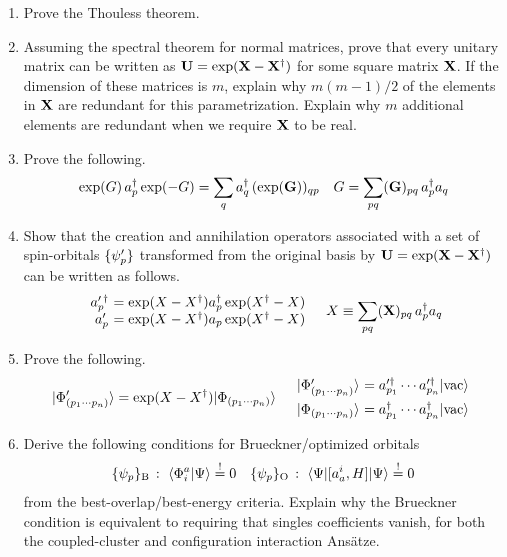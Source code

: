 \documentclass[11pt]{article}
\begin{document}
\begin{enumerate}
\item
Prove the Thouless theorem.

\item
Assuming the spectral theorem for normal matrices, prove that every unitary matrix can be written as
$
  \mathbf{U}
=
  \mathrm{exp}(\mathbf{X} - \mathbf{X}^\dagger)
$
for some square matrix $\mathbf{X}$.
If the dimension of these matrices is $m$, explain why $m(m-1)/2$ of the elements in $\mathbf{X}$ are redundant for this parametrization.
Explain why $m$ additional elements are redundant when we require $\mathbf{X}$ to be real.


\item
Prove the following.
\begin{align}
  \mathrm{exp}(G)\,a_p^\dagger\,\mathrm{exp}(-G)
=
  \sum_q
  a_q^\dagger\,
  (\mathrm{exp}(\mathbf{G}))_{qp}
&&
  G
=
  \sum_{pq}
  (\mathbf{G})_{pq}\,
  a_p^\dagger a_q
\end{align}



\item
Show that the creation and annihilation operators associated with a set of spin-orbitals $\{\psi _p'\}$ transformed from the original basis by $\mathbf{U}=\mathrm{exp}(\mathbf{X} - \mathbf{X}^\dagger)$ can be written as follows.
\begin{align}
\begin{array}{r@{\ }l}
  a_p^{\prime\,\dagger}
&=
  \mr{exp}(X - X\dg)
  a_p\dg\,
  \mr{exp}(X\dg - X)
\\
  a_p^{\prime}
&=
  \mr{exp}(X - X\dg)
  a_p\,
  \mr{exp}(X\dg - X)
\end{array}
&&
  X
\equiv
  \sum_{pq}
  (\bo{X})_{pq}\,
  a_p\dg a_q
\end{align}


\item
Prove the following.
\begin{align}
  \kt{\F'_{(p_1\cd p_n)}}
=
  \mr{exp}(X - X\dg)
  \kt{\F_{(p_1\cd p_n)}}
&&
\begin{array}{r@{\ }l}
  \kt{\F'_{(p_1\cd p_n)}}
&=
  a_{p_1}^{\prime \dagger}
\cd
  a_{p_n}^{\prime \dagger}
  \kt{\vac}
\\[5pt]
  \kt{\F_{(p_1\cd p_n)}}
&=
  a_{p_1}^{ \dagger}
\cd
  a_{p_n}^{ \dagger}
  \kt{\vac}
\end{array}
\end{align}

\item
Derive the following conditions for Brueckner/optimized orbitals
\begin{align}
\label{eq:brueckner-and-oo-explicit-condition}
  \{\psi _p\}_{\mathrm{B}}\,:\,\,
  \langle\Phi _i^a|\Psi \rangle
\overset{!}{=}
  0
&&
  \{\psi _p\}_{\mathrm{O}}\,:\,\,
  \langle\Psi |[a_a^i, H]|\Psi \rangle
\overset{!}{=}
  0
\end{align}
from the best-overlap/best-energy criteria.  Explain why the Brueckner condition is equivalent to requiring that singles coefficients vanish, for both the coupled-cluster and configuration interaction Ans\"atze.



\end{enumerate}
\end{document}
